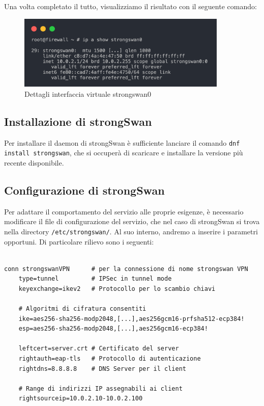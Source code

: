 Una volta completato il tutto, visualizziamo il risultato con il seguente comando:
\begin{figure}[ht]
    \centering
    \includegraphics[width=10cm]{figure/show_sw0.png}
    \caption{Dettagli interfaccia virtuale strongswan0}
\end{figure}

\subsection{Installazione di strongSwan}
Per installare il daemon di strongSwan è sufficiente lanciare il comando \texttt{dnf install strongswan}, che si occuperà di scaricare e installare la versione più recente disponibile.

\subsection{Configurazione di strongSwan}
Per adattare il comportamento del servizio alle proprie esigenze, è necessario modificare il file di configurazione del servizio, che nel caso di strongSwan si trova nella directory \texttt{/etc/strongswan/}.
Al suo interno, andremo a inserire i parametri opportuni. Di particolare rilievo sono i seguenti:

\begin{verbatim}

conn strongswanVPN      # per la connessione di nome strongswan VPN
    type=tunnel         # IPSec in tunnel mode
    keyexchange=ikev2   # Protocollo per lo scambio chiavi

    # Algoritmi di cifratura consentiti
    ike=aes256-sha256-modp2048,[...],aes256gcm16-prfsha512-ecp384!
    esp=aes256-sha256-modp2048,[...],aes256gcm16-ecp384!
    
    leftcert=server.crt # Certificato del server
    rightauth=eap-tls   # Protocollo di autenticazione
    rightdns=8.8.8.8    # DNS Server per il client

    # Range di indirizzi IP assegnabili ai client
    rightsourceip=10.0.2.10-10.0.2.100
\end{verbatim}

